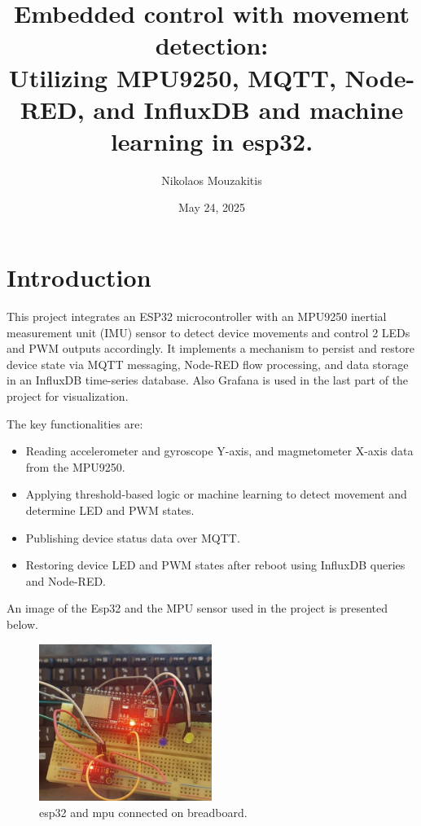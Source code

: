 \documentclass[a4paper,12pt]{article}
\title{Embedded control with movement detection: \\ Utilizing MPU9250, MQTT, Node-RED, and InfluxDB and machine learning in esp32.}
\author{Nikolaos Mouzakitis}
\date{May 24, 2025}
\begin{document}
\maketitle

\section{Introduction}

This project integrates an ESP32 microcontroller with an MPU9250 
inertial measurement unit (IMU) sensor to detect device movements 
and control 2 LEDs and PWM outputs accordingly. 
It implements a mechanism to persist and restore device state 
via MQTT messaging, Node-RED flow processing, and data storage in an InfluxDB time-series database.
Also Grafana is used in the last part of the project for visualization.

The key 
functionalities are:

\begin{itemize}
    \item Reading accelerometer and gyroscope Y-axis, and magmetometer X-axis data from the MPU9250.
    \item Applying threshold-based logic or machine learning to detect movement and determine LED and PWM states.
    \item Publishing device status data over MQTT.
    \item Restoring device LED and PWM states after reboot using InfluxDB queries and Node-RED.
\end{itemize}


An image of the Esp32 and the MPU sensor used in the project is presented below.
		\begin{figure}[H]
			\centering
			\includegraphics[width=0.5\textwidth]{con.jpeg}
			\caption{esp32 and mpu connected on breadboard.}
			\label{fig1:}
		\end{figure}		
\end{document}
